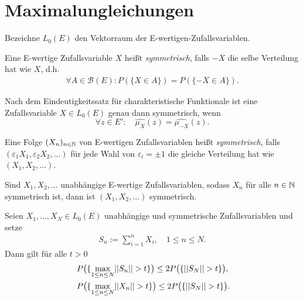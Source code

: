 \section{Maximalungleichungen}

Bezeichne $L_0(E)$ den Vektorraum der E-wertigen-Zufallsvariablen. 

\begin{mydef}
    Eine E-wertige Zufallsvariable $X$ heißt \textit{symmetrisch}, falls $-X$ die selbe Verteilung hat wie $X$, d.h.
    \begin{align*}
        \forall A \in \mathcal{B}(E): P(\{X \in A\}) = P(\{-X \in A\}). 
    \end{align*}
\end{mydef}

\begin{remark}
    Nach dem Eindeutigkeitssatz für charakteristische Funktionale ist eine Zufallsvariable $X \in L_0(E)$ genau dann symmetrisch, wenn 
    $$
        \forall z \in E': \quad \widehat{\mu_X}(z) = \widehat{\mu_{-X}}(z). 
    $$
\end{remark}

\begin{mydef}
    Eine Folge $(X_n)_{n \in \mathbb{N}}$ von E-wertigen Zufallsvariablen heißt \textit{symmetrisch}, 
    falls $(\varepsilon_1 X_1, \varepsilon_2 X_2,...)$ für jede Wahl von $\varepsilon_i = \pm 1$ 
    die gleiche Verteilung hat wie $(X_1,X_2,...)$. 
\end{mydef}

\begin{remark}
   Sind $X_1,X_2,...$ unabhängige E-wertige Zufallsvariablen, sodass $X_n$ für alle $n \in \mathbb{N}$ symmetrisch ist, dann ist $(X_1,X_2,...)$ symmetrisch. 
\end{remark}

\begin{theorem}
    Seien $X_1,...,X_N \in L_0(E)$ unabhängige und symmetrische Zufallsvariablen und setze 
    \begin{align*}
        S_n := \sum_{i=1}^n X_i, \quad 1 \leq n \leq N. 
    \end{align*}
    Dann gilt für alle $t > 0$
    \begin{align}
        &P\big(\{ \max_{1 \leq n \leq N} \lvert \lvert S_n \rvert \rvert > t \}\big) \leq 2 P\big(\{\lvert \lvert S_N \rvert \rvert > t \}\big), \\\
        &P\big(\{ \max_{1 \leq n \leq N} \lvert \lvert X_n \rvert \rvert > t \}\big) \leq 2 P\big(\{\lvert \lvert S_N \rvert \rvert > t \}\big).
    \end{align}
\end{theorem}

